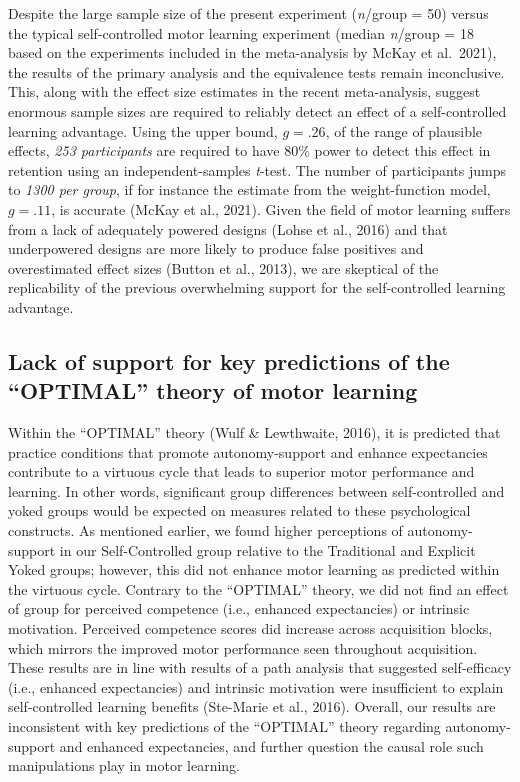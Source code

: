 \documentclass[
  english,
  man,floatsintext]{apa7}
\begin{document}
Despite the large sample size of the present experiment (\emph{n}/group = 50) versus the typical self-controlled motor learning experiment (median \emph{n}/group = 18 based on the experiments included in the meta-analysis by McKay et al.~2021), the results of the primary analysis and the equivalence tests remain inconclusive. This, along with the effect size estimates in the recent meta-analysis, suggest enormous sample sizes are required to reliably detect an effect of a self-controlled learning advantage. Using the upper bound, \(g = .26\), of the range of plausible effects, \emph{253 participants} are required to have 80\% power to detect this effect in retention using an independent-samples \emph{t}-test. The number of participants jumps to \emph{1300 per group}, if for instance the estimate from the weight-function model, \(g = .11\), is accurate (McKay et al., 2021). Given the field of motor learning suffers from a lack of adequately powered designs (Lohse et al., 2016) and that underpowered designs are more likely to produce false positives and overestimated effect sizes (Button et al., 2013), we are skeptical of the replicability of the previous overwhelming support for the self-controlled learning advantage.

\hypertarget{lack-of-support-for-key-predictions-of-the-optimal-theory-of-motor-learning}{%
\subsection{Lack of support for key predictions of the ``OPTIMAL'' theory of motor learning}\label{lack-of-support-for-key-predictions-of-the-optimal-theory-of-motor-learning}}

Within the ``OPTIMAL'' theory (Wulf \& Lewthwaite, 2016), it is predicted that practice conditions that promote autonomy-support and enhance expectancies contribute to a virtuous cycle that leads to superior motor performance and learning. In other words, significant group differences between self-controlled and yoked groups would be expected on measures related to these psychological constructs. As mentioned earlier, we found higher perceptions of autonomy-support in our Self-Controlled group relative to the Traditional and Explicit Yoked groups; however, this did not enhance motor learning as predicted within the virtuous cycle. Contrary to the ``OPTIMAL'' theory, we did not find an effect of group for perceived competence (i.e., enhanced expectancies) or intrinsic motivation. Perceived competence scores did increase across acquisition blocks, which mirrors the improved motor performance seen throughout acquisition. These results are in line with results of a path analysis that suggested self-efficacy (i.e., enhanced expectancies) and intrinsic motivation were insufficient to explain self-controlled learning benefits (Ste-Marie et al., 2016). Overall, our results are inconsistent with key predictions of the ``OPTIMAL'' theory regarding autonomy-support and enhanced expectancies, and further question the causal role such manipulations play in motor learning.
\end{document}
